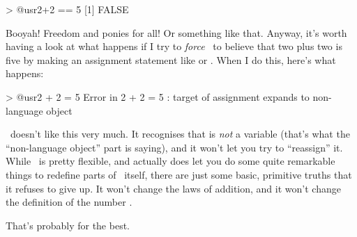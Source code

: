 \begin{rblock1}
> @usr{2+2 == 5}
[1] FALSE
\end{rblock1}
Booyah! Freedom and ponies for all! Or something like that. Anyway, it's worth having a look at what happens if I try to {\it force} \R\ to believe that two plus two is five by making an assignment statement like   or . When I do this, here's what happens:
\begin{rblock1}
> @usr{2 + 2 = 5}
Error in 2 + 2 = 5 : target of assignment expands to non-language object
\end{rblock1}
\R\ doesn't like this very much. It recognises that  is {\it not} a variable (that's what the ``non-language object'' part is saying), and it won't let you try to ``reassign'' it. While \R\ is pretty flexible, and actually does let you do some quite remarkable things to redefine parts of \R\ itself, there are just some basic, primitive truths that it refuses to give up. It won't change the laws of addition, and it won't change the definition of the number . 

That's probably for the best.


